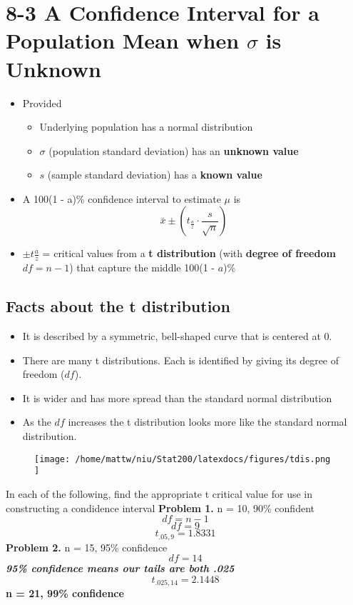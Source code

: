 \documentclass{report}
\begin{document}
\section*{8-3 A Confidence Interval for a Population Mean when $\sigma$ is Unknown}
\begin{itemize}
  \item Provided 
    \begin{itemize}[label=$\circ$]
      \item Underlying population has a normal distribution 
      \item $\sigma$ (population standard deviation) has an \textbf{unknown value}
      \item $s$ (sample standard deviation) has a \textbf{known value}
    \end{itemize}
  \item A 100(1 - a)\% confidence interval to estimate $\mu$ is
    $$ \bar{x} \pm \left(t_{\frac{a}{z}}\cdot \frac{s}{\sqrt{n}}\right)$$
  \item $\pm{t\frac{a}{z}}$ = critical values from a \textbf{t distribution} (with \textbf{degree of freedom} $df = n-1$) that capture the middle 100(1 - $a$)\%
\end{itemize}
\bigbreak \noindent
\subsection*{Facts about the t distribution}
\begin{itemize}
  \item It is described by a symmetric, bell-shaped curve that is centered at 0. 
  \item There are many t distributions. Each is identified by giving its degree of freedom ($df$).
  \item It is wider and has more spread than the standard normal distribution
  \item As the $df$ increases the t distribution looks more like the standard normal distribution.
\end{itemize}
\begin{figure}[ht]
\centering
\texttt{[image:  /home/mattw/niu/Stat200/latexdocs/figures/tdis.png ]}
\end{figure}
\q In each of the following, find the appropriate t critical value for use in constructing a condidence interval
\bigbreak \noindent
\textbf{Problem 1. } n = 10, 90\% confident
$$ df = n - 1$$
$$ df = 9$$
$$t_{.05,9} = 1.8331$$
\bigbreak \noindent \bigbreak \noindent
\textbf{Problem 2.} n = 15, 95\% confidence
$$ df = 14$$
\textit{\textbf{95\% confidence means our tails are both .025}}
$$ t_{.025,14}= 2.1448 $$
\bigbreak \bigbreak \noindent
\textbf{n = 21, 99\% confidence}
\end{document}
